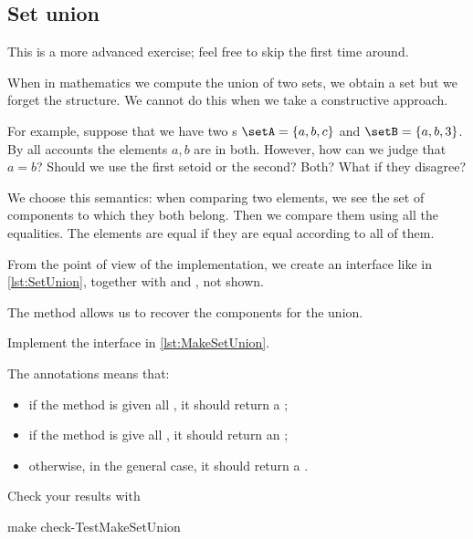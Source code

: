 \subsection{Set union \hardexercise}
\begin{remark}
  This is a more advanced exercise; feel free to skip the first time around.
\end{remark}


When in mathematics we compute the union of two sets, we obtain a set but we forget the structure. We cannot do this when we take a constructive approach.

For example, suppose that we have two \Setoid{}s $\setA = \{a,b,c\}$ and $\setB = \{a,b,3\}$.
By all accounts the elements $a,b$ are in both. However, how can we judge that $a=b$? Should we use the first setoid or the second? Both? What if they disagree?

We choose this semantics: when comparing two elements, we see the set of components to which they both belong. Then we compare them using all the equalities. The elements are equal if they are equal according to all of them.

From the point of view of the implementation, we create an interface like
in \cref{lst:SetUnion}, together with \EnumerableSetUnion and \FiniteSetUnion, not shown.


The method  allows us to recover the components for the union.

\begin{codeexercise}
  Implement the interface in \cref{lst:MakeSetUnion}.
\end{codeexercise}

The  annotations means that:
\begin{itemize}
  \item if the method is given all \FiniteSet, it should return a \FiniteSet;
  \item if the method is give all \EnumerableSet, it should return an \EnumerableSet;
  \item otherwise, in the general case, it should return a \Setoid.
\end{itemize}


Check your results with
\begin{console}
  make check-TestMakeSetUnion
\end{console}


